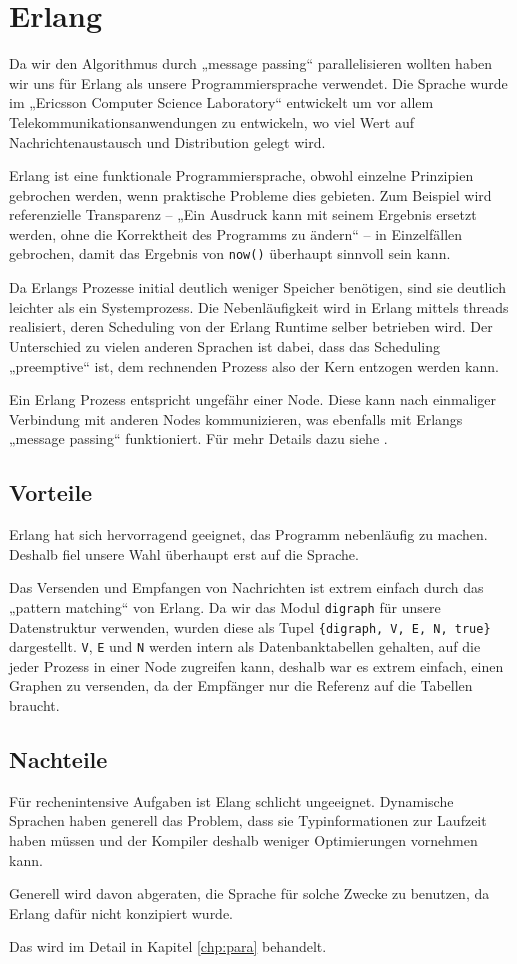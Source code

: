 \chapter{Erlang}
Da wir den Algorithmus durch „message passing“ parallelisieren wollten
haben wir uns für Erlang als unsere Programmiersprache verwendet.  Die
Sprache wurde im „Ericsson Computer Science Laboratory“ entwickelt um
vor allem Telekommunikationsanwendungen zu entwickeln, wo viel Wert
auf Nachrichtenaustausch und Distribution gelegt wird.

Erlang ist eine funktionale Programmiersprache, obwohl einzelne
Prinzipien gebrochen werden, wenn praktische Probleme dies gebieten.
Zum Beispiel wird referenzielle Transparenz – „Ein Ausdruck kann mit
seinem Ergebnis ersetzt werden, ohne die Korrektheit des Programms zu
ändern“ – in Einzelfällen gebrochen, damit das Ergebnis von
\lstinline!now()! überhaupt sinnvoll sein kann.

Da Erlangs Prozesse initial deutlich weniger Speicher benötigen, sind
sie deutlich leichter als ein Systemprozess.  Die Nebenläufigkeit wird
in Erlang mittels threads realisiert, deren Scheduling von der Erlang
Runtime selber betrieben wird.  Der Unterschied zu vielen anderen
Sprachen ist dabei, dass das Scheduling „preemptive“ ist, dem
rechnenden Prozess also der Kern entzogen werden kann.

Ein Erlang Prozess entspricht ungefähr einer Node.  Diese kann nach
einmaliger Verbindung mit anderen Nodes kommunizieren, was ebenfalls
mit Erlangs „message passing“ funktioniert.  Für mehr Details dazu
siehe \cite[Kapitel~„Distribunomicon“]{lyse}.

\section{Vorteile}
Erlang hat sich hervorragend geeignet, das Programm nebenläufig zu
machen.  Deshalb fiel unsere Wahl überhaupt erst auf die Sprache.

Das Versenden und Empfangen von Nachrichten ist extrem einfach durch
das „pattern matching“ von Erlang.  Da wir das Modul
\lstinline{digraph} für unsere Datenstruktur verwenden, wurden diese
als Tupel \lstinline!{digraph, V, E, N, true}!  dargestellt.
\lstinline!V!, \lstinline!E! und \lstinline!N! werden intern als
Datenbanktabellen gehalten, auf die jeder Prozess in einer Node
zugreifen kann, %
deshalb war es extrem einfach, einen Graphen zu versenden, da der
Empfänger nur die Referenz auf die Tabellen braucht.
\section{Nachteile}
Für rechenintensive Aufgaben ist Elang schlicht ungeeignet.
Dynamische Sprachen haben generell das Problem, dass sie
Typinformationen zur Laufzeit haben müssen und der Kompiler deshalb
weniger Optimierungen vornehmen kann.

Generell wird davon abgeraten, die Sprache für solche Zwecke zu
benutzen, da Erlang dafür nicht konzipiert wurde.
\cite[Kapitel~3]{lyse}

Das wird im Detail in Kapitel \ref{chp:para}
behandelt.
